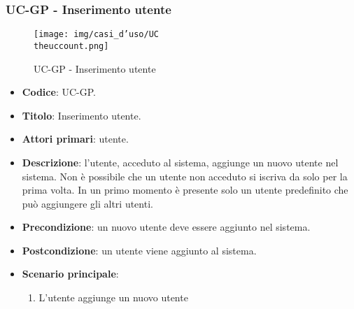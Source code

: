 \subsubsection{UC\theuccount-GP - Inserimento utente}
		\begin{figure}[H]
			\centering
				\texttt{[image: img/casi\_d'uso/UC\\theuccount.png]}\\
			\caption{UC\theuccount-GP - Inserimento utente}
		\end{figure}
	\begin{itemize}
		\item \textbf{Codice}: UC\theuccount-GP.
		\item \textbf{Titolo}: Inserimento utente.
		\item \textbf{Attori primari}: utente.
		\item \textbf{Descrizione}: l'utente, acceduto al sistema, aggiunge un nuovo utente nel sistema.
		Non è possibile che un utente non acceduto si iscriva da solo per la prima volta.
		In un primo momento è presente solo un utente predefinito che può aggiungere gli altri utenti.
		\item \textbf{Precondizione}: un nuovo utente deve essere aggiunto nel sistema.
		\item \textbf{Postcondizione}: un utente viene aggiunto al sistema.
		\item \textbf{Scenario principale}:
		\begin{enumerate}
			\item L'utente aggiunge un nuovo utente
		\end{enumerate}
	\end{itemize}


